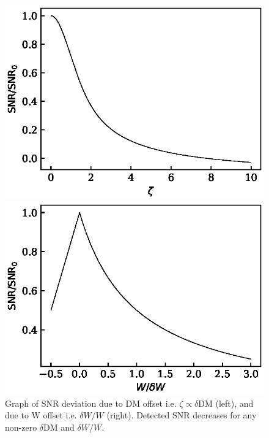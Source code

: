 \begin{figure}
    \centering
    \begin{minipage}{0.5\textwidth}
    \includegraphics[width=\textwidth]{Graphs/snrdm.eps}
    \end{minipage}%
    \begin{minipage}{0.5\textwidth}
    \includegraphics[width=\textwidth]{Graphs/snrw.eps}
    \end{minipage}
    \caption[SNR deviation due to DM and W offset]{Graph of SNR deviation due to DM offset i.e. $\zeta \propto \delta\text{DM}$ (left), and due to W offset i.e. $\delta W/W$ (right). Detected SNR decreases for any non-zero $\delta\text{DM}$ and $\delta W/W$.}
    \label{fig:snrdev}
\end{figure}

